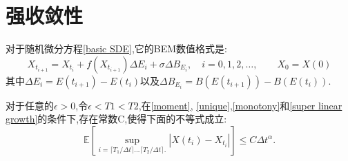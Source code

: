 \section{强收敛性}
对于随机微分方程\cref{basic SDE},它的BEM数值格式是:
\begin{equation}\label{eq:1}
	X_{t_{i+1}}=X_{t_i}+f(X_{t_{i+1}})\Delta E_{i}+\sigma\Delta B_{E_{i}},\quad i=0,1,2,\ldots,\qquad X_0=X(0)
\end{equation}
其中$\Delta E_{i}=E(t_{i+1})-E(t_i)$以及$\Delta B_{E_{i}}=B(E{(t_{i+1})})-B(E({t_i}))$.
\begin{theorem}\label{main th}
	对于任意的$\epsilon>0$,令$\epsilon < T1 < T2$,在\cref{moment}, \cref{unique},\cref{monotony}和\cref{super linear growth}的条件下,存在常数C,使得下面的不等式成立:
	$$\mathbb{E}\left[\sup\limits_{i=\lceil T_1/\Delta t \rceil\ldots \lceil T_2/\Delta t \rceil. } |X({t_i})-X_{t_i}|\right]\le C\Delta t^\alpha.$$
\end{theorem}
